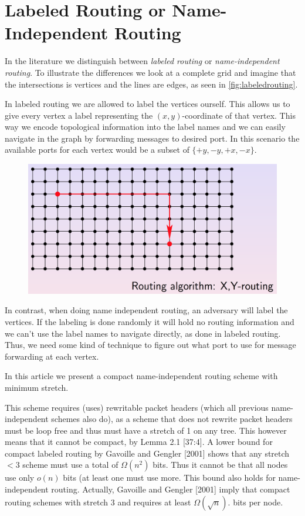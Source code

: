 \section*{Labeled Routing or Name-Independent Routing}
In the literature we distinguish between \emph{labeled routing} or
\emph{name-independent routing}. To illustrate the differences we look at a complete
grid and imagine that the intersections is vertices and the lines are edges, as seen in \autoref{fig:labeledrouting}.

In labeled routing we are allowed to label the vertices ourself. This allows
us to give every vertex a label representing the $(x,y)$-coordinate of that
vertex. This way we encode topological information into the label names and we
can easily navigate in the graph by forwarding messages to desired port. In
this scenario the available ports for each vertex would be a subset of $\{+y,
-y, +x, -x\}$.
\begin{figure}[htbp]
    \centering
    \includegraphics[scale=0.3]{images/xyrouting.png} 
    \label{fig:labeledrouting}
\end{figure}

In contrast, when doing name independent routing, an adversary will label the
vertices. If the labeling is done randomly it will hold no routing information
and we can't use the label names to navigate directly, as done in labeled routing. Thus, we need some kind of
technique to figure out what port to use for message forwarding at each vertex.

In this article we present a compact name-independent routing scheme with minimum stretch.

This scheme requires (uses) rewritable packet headers (which all previous name-independent schemes also do), as a scheme that does not rewrite packet headers must be loop free and thus must have a stretch of 1 on any tree. This however means that it cannot be compact, by Lemma 2.1 \cite{compactNameIndepRouting}[37:4]. A lower bound for compact labeled routing by Gavoille and Gengler [2001] shows that any stretch $< 3$ scheme must use a total of $\Omega(n^2)$ bits. Thus it cannot be that all nodes use only $o(n)$ bits (at least one must use more. This bound also holds for name-independent routing. Actually, Gavoille and Gengler [2001] imply that compact routing schemes with stretch 3 and requires at least $\Omega(\sqrt{n})$. bits per node.

